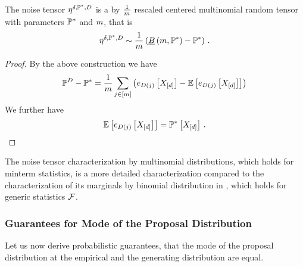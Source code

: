 \begin{theorem}
    \label{the:multinomialEmpdistFluctuation}
    The noise tensor $\eta^{\delta,\mathbb{P}^*,D}$ is a by $\frac{1}{m}$ rescaled centered multinomial random tensor with parameters $\mathbb{P}^*$ and $m$, that is
    \begin{align*}
        \eta^{\delta,\mathbb{P}^*,D} \sim \frac{1}{m} \left( \underline{B}\left(m,\mathbb{P}^*\right) - \mathbb{P}^* \right) \, .
    \end{align*}
\end{theorem}
\begin{proof}
    By the above construction we have
    \begin{align*}
        \mathbb{P}^{D} - \mathbb{P}^*
        = \frac{1}{m}\sum_{j\in[m]} \left( e_{D(j)}\left[X_{[d]}\right] - \mathbb{E}\left[e_{D(j)}\left[X_{[d]}\right]\right] \right)
    \end{align*}
    We further have
    \begin{align*}
        \mathbb{E}\left[e_{D(j)}\left[X_{[d]}\right]\right] = \mathbb{P}^*\left[X_{[d]}\right] \, .
    \end{align*}
\end{proof}

The noise tensor characterization by multinomial distributions, which holds for minterm statistics, is a more detailed characterization compared to the characterization of its marginals by binomial distribution in , which holds for generic statistics $\mathcal{F}$.

\subsubsection{Guarantees for Mode of the Proposal Distribution}

Let us now derive probabilistic guarantees, that the mode of the proposal distribution at the empirical and the generating distribution are equal.


